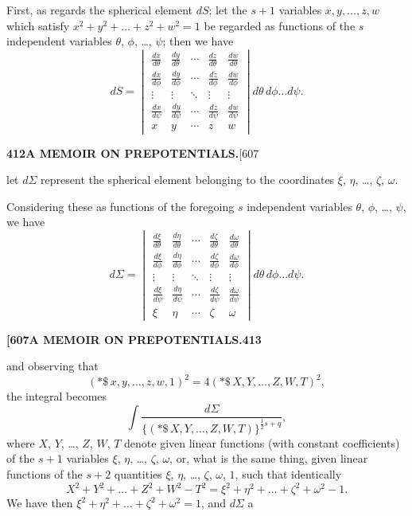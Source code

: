 \documentclass[11pt,a4paper]{article}
\begin{document}
{First, as regards the spherical element $dS$; let the $s+1$ variables $x, y, \ldots, z, w$ which satisfy $x^2 + y^2 + \ldots + z^2 + w^2 = 1$ be regarded as functions of the $s$ independent variables $\theta$, $\phi$, \ldots, $\psi$; then we have
\[
dS = \begin{vmatrix}
\frac{dx}{d\theta} & \frac{dy}{d\theta} & \cdots & \frac{dz}{d\theta} & \frac{dw}{d\theta}\\[4pt]
\frac{dx}{d\phi} & \frac{dy}{d\phi} & \cdots & \frac{dz}{d\phi} & \frac{dw}{d\phi}\\[4pt]
\vdots & \vdots & \ddots & \vdots & \vdots\\[4pt]
\frac{dx}{d\psi} & \frac{dy}{d\psi} & \cdots & \frac{dz}{d\psi} & \frac{dw}{d\psi}\\[4pt]
x & y & \cdots & z & w
\end{vmatrix} d\theta\, d\phi \ldots d\psi.
\]

\newpage
\noindent\textbf{412}\hspace{\fill}\textbf{A MEMOIR ON PREPOTENTIALS.}\hspace{\fill}[607

let $d\Sigma$ represent the spherical element belonging to the coordinates $\xi$, $\eta$, \ldots, $\zeta$, $\omega$.

Considering these as functions of the foregoing $s$ independent variables $\theta$, $\phi$, \ldots, $\psi$, we have
\[
d\Sigma = \begin{vmatrix}
\frac{d\xi}{d\theta} & \frac{d\eta}{d\theta} & \cdots & \frac{d\zeta}{d\theta} & \frac{d\omega}{d\theta}\\[4pt]
\frac{d\xi}{d\phi} & \frac{d\eta}{d\phi} & \cdots & \frac{d\zeta}{d\phi} & \frac{d\omega}{d\phi}\\[4pt]
\vdots & \vdots & \ddots & \vdots & \vdots\\[4pt]
\frac{d\xi}{d\psi} & \frac{d\eta}{d\psi} & \cdots & \frac{d\zeta}{d\psi} & \frac{d\omega}{d\psi}\\[4pt]
\xi & \eta & \cdots & \zeta & \omega
\end{vmatrix} d\theta\, d\phi \ldots d\psi.
\]

\newpage
\noindent\textbf{[607}\hspace{\fill}\textbf{A MEMOIR ON PREPOTENTIALS.}\hspace{\fill}\textbf{413}

and observing that
\[
(*\!\!\$\, x, y, \ldots, z, w, 1)^2 = 4(*\!\!\$\, X, Y, \ldots, Z, W, T)^2,
\]
the integral becomes
\[
\int \frac{d\Sigma}{\{(*\!\!\$\, X, Y, \ldots, Z, W, T)\}^{\frac{1}{2}s+q}},
\]
where $X$, $Y$, \ldots, $Z$, $W$, $T$ denote given linear functions (with constant coefficients) of the $s+1$ variables $\xi$, $\eta$, \ldots, $\zeta$, $\omega$, or, what is the same thing, given linear functions of the $s+2$ quantities $\xi$, $\eta$, \ldots, $\zeta$, $\omega$, $1$, such that identically
\[
X^2 + Y^2 + \ldots + Z^2 + W^2 - T^2 = \xi^2 + \eta^2 + \ldots + \zeta^2 + \omega^2 - 1.
\]
We have then $\xi^2 + \eta^2 + \ldots + \zeta^2 + \omega^2 = 1$, and $d\Sigma$ a

}
\end{document}

